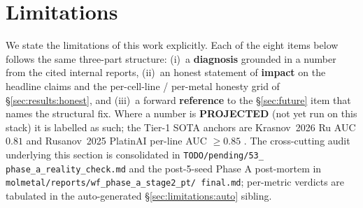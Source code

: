 %
%

\section{Limitations}\label{sec:limitations}

We state the limitations of this work explicitly.  Each of the eight
items below follows the same three-part structure: (i)~a \textbf{diagnosis}
grounded in a \MEASURED{} number from the cited internal reports,
(ii)~an honest statement of \textbf{impact} on the headline claims and
the per-cell-line / per-metal honesty grid of \S\ref{sec:results:honest},
and (iii)~a forward \textbf{reference} to the \S\ref{sec:future} item
that names the structural fix.  Where a number is \textbf{PROJECTED}
(not yet run on this stack) it is labelled as such; the Tier-1 SOTA
anchors are Krasnov~2026 Ru AUC $0.81$
\citep{krasnov2026metalcytotoxdb} and Rusanov~2025 PlatinAI per-line
AUC $\geq 0.85$ \citep{rusanov2025platinai}.  The cross-cutting audit
underlying this section is consolidated in \texttt{TODO/pending/53\_
phase\_a\_reality\_check.md} and the post-5-seed Phase A
post-mortem in \texttt{molmetal/reports/wf\_phase\_a\_stage2\_pt/
final.md}; per-metric verdicts are tabulated in the auto-generated
\S\ref{sec:limitations:auto} sibling.

